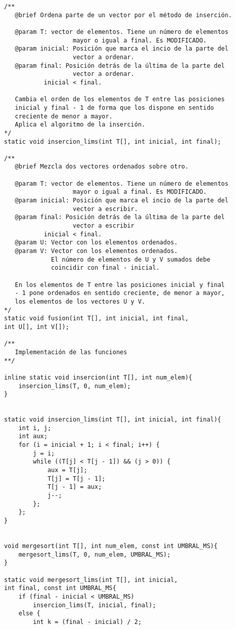 \documentclass[12pt,spanish]{article}
\begin{document}
\begin{verbatim}
/**
   @brief Ordena parte de un vector por el método de inserción.

   @param T: vector de elementos. Tiene un número de elementos
                   mayor o igual a final. Es MODIFICADO.
   @param inicial: Posición que marca el incio de la parte del
                   vector a ordenar.
   @param final: Posición detrás de la última de la parte del
                   vector a ordenar.
		   inicial < final.

   Cambia el orden de los elementos de T entre las posiciones
   inicial y final - 1 de forma que los dispone en sentido 
   creciente de menor a mayor.
   Aplica el algoritmo de la inserción.
*/
static void insercion_lims(int T[], int inicial, int final);

/**
   @brief Mezcla dos vectores ordenados sobre otro.

   @param T: vector de elementos. Tiene un número de elementos
                   mayor o igual a final. Es MODIFICADO.
   @param inicial: Posición que marca el incio de la parte del
                   vector a escribir.
   @param final: Posición detrás de la última de la parte del
                   vector a escribir
		   inicial < final.
   @param U: Vector con los elementos ordenados.
   @param V: Vector con los elementos ordenados.
             El número de elementos de U y V sumados debe 
             coincidir con final - inicial.

   En los elementos de T entre las posiciones inicial y final 
   - 1 pone ordenados en sentido creciente, de menor a mayor,
   los elementos de los vectores U y V.
*/
static void fusion(int T[], int inicial, int final, 
int U[], int V[]);

/**
   Implementación de las funciones
**/

inline static void insercion(int T[], int num_elem){
	insercion_lims(T, 0, num_elem);
}


static void insercion_lims(int T[], int inicial, int final){
	int i, j;
	int aux;
	for (i = inicial + 1; i < final; i++) {
		j = i;
		while ((T[j] < T[j - 1]) && (j > 0)) {
			aux = T[j];
			T[j] = T[j - 1];
			T[j - 1] = aux;
			j--;
		};
	};
}


void mergesort(int T[], int num_elem, const int UMBRAL_MS){
	mergesort_lims(T, 0, num_elem, UMBRAL_MS);
}

static void mergesort_lims(int T[], int inicial, 
int final, const int UMBRAL_MS{
	if (final - inicial < UMBRAL_MS)
		insercion_lims(T, inicial, final);
	else {
		int k = (final - inicial) / 2;


\end{verbatim}
\end{document}
